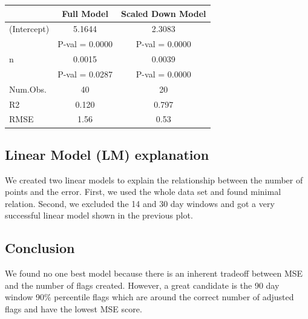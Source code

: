 \documentclass[
]{article}
\begin{document}
\begin{table}
\centering
\begin{tabular}[t]{lcc}
\toprule
  & Full Model & Scaled Down Model\\
\midrule
(Intercept) & \num{5.1644} & \num{2.3083}\\
 & P-val = \num{0.0000} & P-val = \num{0.0000}\\
n & \num{0.0015} & \num{0.0039}\\
 & P-val = \num{0.0287} & P-val = \num{0.0000}\\
\midrule
Num.Obs. & \num{40} & \num{20}\\
R2 & \num{0.120} & \num{0.797}\\
RMSE & \num{1.56} & \num{0.53}\\
\bottomrule
\end{tabular}
\end{table}

\hypertarget{linear-model-lm-explanation}{%
\subsection{Linear Model (LM)
explanation}\label{linear-model-lm-explanation}}

We created two linear models to explain the relationship between the
number of points and the error. First, we used the whole data set and
found minimal relation. Second, we excluded the 14 and 30 day windows
and got a very successful linear model shown in the previous plot.

\hypertarget{conclusion}{%
\subsection{Conclusion}\label{conclusion}}

We found no one best model because there is an inherent tradeoff between
MSE and the number of flags created. However, a great candidate is the
90 day window 90\% percentile flags which are around the correct number
of adjusted flags and have the lowest MSE score.
\end{document}
